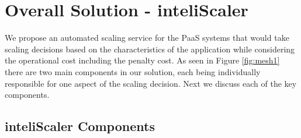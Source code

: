 \section{Overall Solution - inteliScaler}
We propose an automated scaling service for the PaaS systems that would take scaling decisions based on the characteristics of the application while considering the operational cost including the penalty cost. As seen in Figure \ref{fig:mesh1} there are two main components in our solution, each being individually responsible for one aspect of the scaling decision. Next we discuss each of the key components.

\subsection{inteliScaler Components}